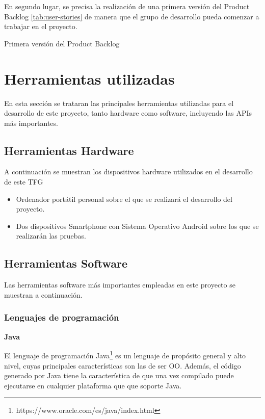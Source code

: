 En segundo lugar, se precisa la realización de una primera versión del Product Backlog \ref{tab:user-stories} de manera que el grupo de desarrollo pueda comenzar a trabajar en el proyecto.

\begin{table}[hp]
  \centering
  {\small
  
  }
  \caption[Primera versión del Product Backlog]
  {Primera versión del Product Backlog}
  \label{tab:user-stories}
\end{table}






\section{Herramientas utilizadas}

En esta sección se trataran las principales herramientas utilizadas para el desarrollo de este proyecto, tanto hardware como software, incluyendo las \acs{API}s más importantes.

\subsection{Herramientas Hardware}

A continuación se muestran los dispositivos hardware utilizados en el desarrollo de este \ac{TFG}
\begin{itemize}
\item Ordenador portátil personal sobre el que se realizará el desarrollo del proyecto.
\item Dos dispositivos Smartphone con Sistema Operativo Android sobre los que se realizarán las pruebas.
\end{itemize}

\subsection{Herramientas Software}

Las herramientas software más importantes empleadas en este proyecto se muestran a continuación.

\subsubsection{Lenguajes de programación}

\textbf{Java}

El lenguaje de programación Java\footnote{https://www.oracle.com/es/java/index.html} es un lenguaje de propósito general y alto nivel, cuyas principales características son las de ser \ac{OO}. Además, el código generado por Java tiene la característica de que una vez compilado puede ejecutarse en cualquier plataforma que que soporte Java.

